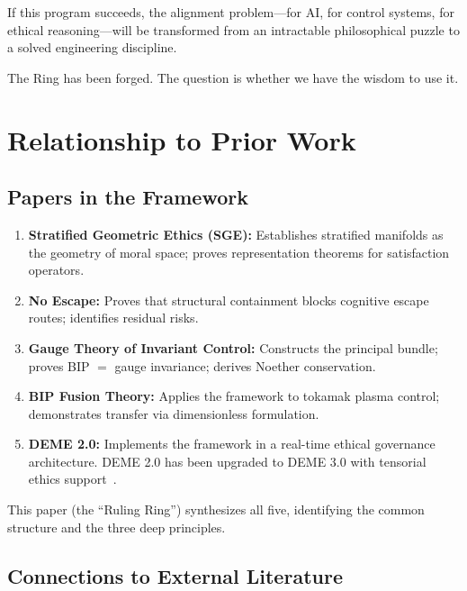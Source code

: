 \documentclass[12pt]{article}
\begin{document}
If this program succeeds, the alignment problem---for AI, for control systems, for ethical reasoning---will be transformed from an intractable philosophical puzzle to a solved engineering discipline.

The Ring has been forged. The question is whether we have the wisdom to use it.

\appendix

\section{Relationship to Prior Work}

\subsection{Papers in the Framework}

\begin{enumerate}
    \item \textbf{Stratified Geometric Ethics (SGE):} Establishes stratified manifolds as the geometry of moral space; proves representation theorems for satisfaction operators.

    \item \textbf{No Escape:} Proves that structural containment blocks cognitive escape routes; identifies residual risks.

    \item \textbf{Gauge Theory of Invariant Control:} Constructs the principal bundle; proves BIP $=$ gauge invariance; derives Noether conservation.

    \item \textbf{BIP Fusion Theory:} Applies the framework to tokamak plasma control; demonstrates transfer via dimensionless formulation.

    \item \textbf{DEME 2.0:} Implements the framework in a real-time ethical governance architecture. DEME 2.0 has been upgraded to DEME 3.0 with tensorial ethics support~\cite{bond2026erisml}.
\end{enumerate}

This paper (the ``Ruling Ring'') synthesizes all five, identifying the common structure and the three deep principles.

\subsection{Connections to External Literature}
\end{document}
